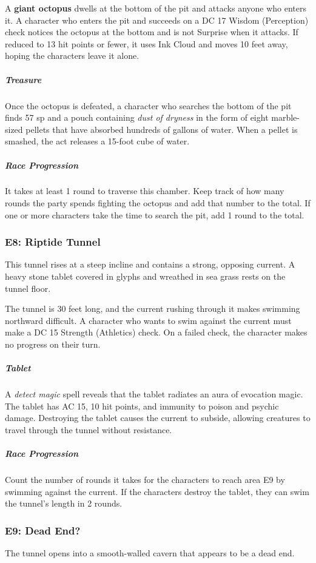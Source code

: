 \documentclass[10pt,a4paper,twoside,bg=print,twocolumn,openany,nodeprecatedcode]{dndbook}
\begin{document}
A \textbf{giant octopus} dwells at the bottom of the pit and attacks anyone who enters it. A character who enters the pit and succeeds on a DC 17 Wisdom (Perception) check notices the octopus at the bottom and is not Surprise when it attacks. If reduced to 13 hit points or fewer, it uses Ink Cloud and moves 10 feet away, hoping the characters leave it alone.

\subparagraph{Treasure}
Once the octopus is defeated, a character who searches the bottom of the pit finds 57 sp and a pouch containing \textit{dust of dryness} in the form of eight marble-sized pellets that have absorbed hundreds of gallons of water. When a pellet is smashed, the act releases a 15-foot cube of water.

\subparagraph{Race Progression}
It takes at least 1 round to traverse this chamber. Keep track of how many rounds the party spends fighting the octopus and add that number to the total. If one or more characters take the time to search the pit, add 1 round to the total.

\subsubsection{E8: Riptide Tunnel}
\begin{DndReadAloud}{}
This tunnel rises at a steep incline and contains a strong, opposing current. A heavy stone tablet covered in glyphs and wreathed in sea grass rests on the tunnel floor.

\end{DndReadAloud}

The tunnel is 30 feet long, and the current rushing through it makes swimming northward difficult. A character who wants to swim against the current must make a DC 15 Strength (Athletics) check. On a failed check, the character makes no progress on their turn.

\subparagraph{Tablet}
A \textit{detect magic} spell reveals that the tablet radiates an aura of evocation magic. The tablet has AC 15, 10 hit points, and immunity to poison and psychic damage. Destroying the tablet causes the current to subside, allowing creatures to travel through the tunnel without resistance.

\subparagraph{Race Progression}
Count the number of rounds it takes for the characters to reach area E9 by swimming against the current. If the characters destroy the tablet, they can swim the tunnel's length in 2 rounds.

\subsubsection{E9: Dead End?}
\begin{DndReadAloud}{}
The tunnel opens into a smooth-walled cavern that appears to be a dead end.

\end{DndReadAloud}
\end{document}
